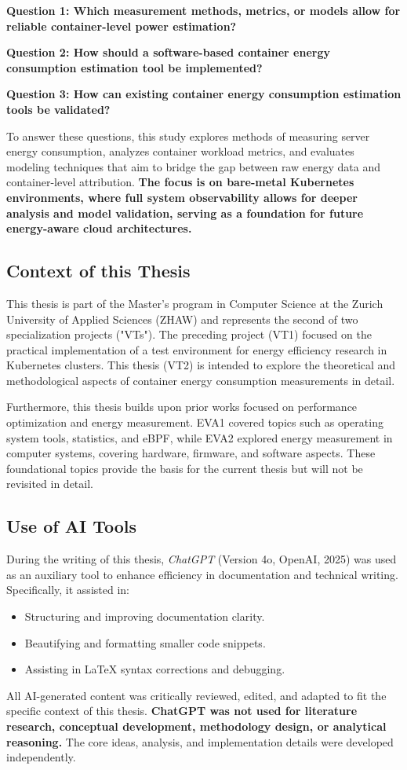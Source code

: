 \textbf{Question 1: Which measurement methods, metrics, or models allow for reliable container-level power estimation?}

\textbf{Question 2: How should a software-based container energy consumption estimation tool be implemented?}

\textbf{Question 3: How can existing container energy consumption estimation tools be validated?}

To answer these questions, this study explores methods of measuring server energy consumption, analyzes container workload metrics, and evaluates modeling techniques that aim to bridge the gap between raw energy data and container-level attribution. \textbf{The focus is on bare-metal Kubernetes environments, where full system observability allows for deeper analysis and model validation, serving as a foundation for future energy-aware cloud architectures.} 

\subsection{Context of this Thesis}

This thesis is part of the Master's program in Computer Science at the Zurich University of Applied Sciences (ZHAW) and represents the second of two specialization projects ("VTs"). The preceding project (VT1) focused on the practical implementation of a test environment for energy efficiency research in Kubernetes clusters. This thesis (VT2) is intended to explore the theoretical and methodological aspects of container energy consumption measurements in detail.

Furthermore, this thesis builds upon prior works focused on performance optimization and energy measurement. EVA1 covered topics such as operating system tools, statistics, and eBPF, while EVA2 explored energy measurement in computer systems, covering hardware, firmware, and software aspects. These foundational topics provide the basis for the current thesis but will not be revisited in detail.

\subsection{Use of AI Tools}
During the writing of this thesis, \textit{ChatGPT}\parencite{OpenAI_ChatGPT_2025} (Version 4o, OpenAI, 2025) was used as an auxiliary tool to enhance efficiency in documentation and technical writing. Specifically, it assisted in:
\begin{itemize}
\item Structuring and improving documentation clarity.
\item Beautifying and formatting smaller code snippets.
\item Assisting in LaTeX syntax corrections and debugging.
\end{itemize}
All AI-generated content was critically reviewed, edited, and adapted to fit the specific context of this thesis. \textbf{ChatGPT was not used for literature research, conceptual development, methodology design, or analytical reasoning.} The core ideas, analysis, and implementation details were developed independently.


